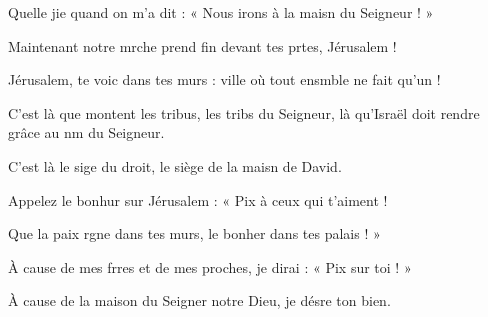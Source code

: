 \item Quelle jie quand on m’a dit :\psstar{} « Nous irons à la maisn du Seigneur ! »
\item Maintenant notre mrche prend fin\psstar{} devant tes prtes, Jérusalem !
\item Jérusalem, te voic dans tes murs :\psstar{} ville où tout ensmble ne fait qu’un !
\item C’est là que montent les tribus, les tribs du Seigneur,\psstar{} là qu’Israël doit rendre grâce au nm du Seigneur.
\item C’est là le sige du droit,\psstar{} le siège de la maisn de David.
\item Appelez le bonhur sur Jérusalem :\psstar{} « Pix à ceux qui t’aiment !
\item Que la paix rgne dans tes murs,\psstar{} le bonher dans tes palais ! »
\item À cause de mes frres et de mes proches,\psstar{} je dirai : « Pix sur toi ! »
\item À cause de la maison du Seigner notre Dieu,\psstar{} je désre ton bien.